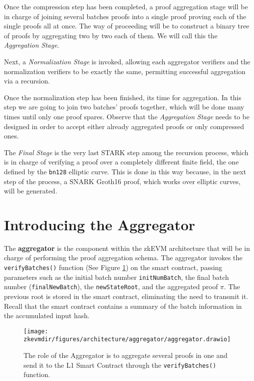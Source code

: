 Once the compression step has been completed, a proof aggregation stage will be in charge of joining several batches proofs into a single proof proving each of the single proofs all at once. The way of proceeding will be to construct a binary tree of proofs by aggregating two by two each of them. We will call this the \textit{Aggregation Stage}.

Next, a \textit{Normalization Stage} is invoked, allowing each aggregator verifiers and the normalization verifiers to be exactly the same, permitting successful aggregation via a recursion.

Once the normalization step has been finished, its time for aggregation. In this step we are going to join two batches' proofs together, which will be done many times until only one proof spares. Observe that the \textit{Aggregation Stage} needs to be designed in order to accept either already aggregated proofs or only compressed ones.

The \textit{Final Stage} is the very last STARK step among the recursion process, which is in charge of verifying a proof over a completely different finite field, the one defined by the \texttt{bn128} elliptic curve. This is done in this way because, in the next step of the process, a SNARK Groth16 proof, which works over elliptic curves, will be generated.



\section{Introducing the Aggregator}

The \textbf{aggregator} is the component within the zkEVM architecture that will be in charge of performing the proof aggregation schema. The aggregator invokes the \texttt{verifyBatches()} function (See Figure \ref{fig:aggregator}) on the smart contract, passing parameters such as the initial batch number \texttt{initNumBatch}, the final batch number (\texttt{finalNewBatch}), the \texttt{newStateRoot}, and the aggregated proof $\pi$. The previous root is stored in the smart contract, eliminating the need to transmit it. Recall that the smart contract contains a summary of the batch information in the accumulated input hash.


\begin{figure}[h]
\centering
\texttt{[image: \\zkevmdir/figures/architecture/aggregator/aggregator.drawio]}
\caption{The role of the Aggregator is to aggregate several proofs in one and send it to the L1 Smart Contract through the \texttt{verifyBatches()} function.}
\label{fig:aggregator}
\end{figure}

